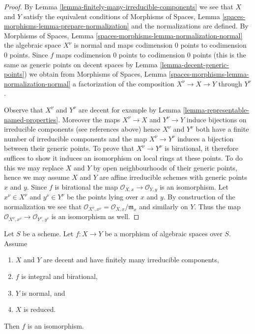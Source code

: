 \begin{proof}
By Lemma \ref{lemma-finitely-many-irreducible-components} we see that
$X$ and $Y$ satisfy the equivalent conditions of
Morphisms of Spaces, Lemma \ref{spaces-morphisms-lemma-prepare-normalization}
and the normalizations are defined. By
Morphisms of Spaces, Lemma \ref{spaces-morphisms-lemma-normalization-normal}
the algebraic space $X^\nu$ is normal and maps codimension $0$ points
to codimension $0$ points. Since $f$ maps codimension $0$ points to
codimension $0$ points (this is the same as generic points on decent
spaces by Lemma \ref{lemma-decent-generic-points})
we obtain from
Morphisms of Spaces, Lemma \ref{spaces-morphisms-lemma-normalization-normal}
a factorization of the composition $X^\nu \to X \to Y$ through $Y^\nu$.

\medskip\noindent
Observe that $X^\nu$ and $Y^\nu$ are decent for example by
Lemma \ref{lemma-representable-named-properties}.
Moreover the maps $X^\nu \to X$ and $Y^\nu \to Y$
induce bijections on irreducible components (see references above)
hence $X^\nu$ and $Y^\nu$ both have a finite number of irreducible
components and the map $X^\nu \to Y^\nu$ induces a bijection
between their generic points.
To prove that $X^\nu \to Y^\nu$ is birational, it therefore
suffices to show it induces an isomorphism on local rings at
these points. To do this we may replace $X$ and $Y$ by open neighbourhoods
of their generic points, hence we may assume $X$ and $Y$ are affine
irreducible schemes with generic points $x$ and $y$. Since
$f$ is birational the map $\mathcal{O}_{X, x} \to \mathcal{O}_{Y, y}$
is an isomorphism. Let $x^\nu \in X^\nu$ and $y^\nu \in Y^\nu$ be
the points lying over $x$ and $y$.
By construction of the normalization
we see that $\mathcal{O}_{X^\nu, x^\nu} = \mathcal{O}_{X, x}/\mathfrak m_x$
and similarly on $Y$. Thus the map
$\mathcal{O}_{X^\nu, x^\nu} \to \mathcal{O}_{Y^\nu, y^\nu}$
is an isomorphism as well.
\end{proof}

\begin{lemma}
\label{lemma-finite-birational-over-normal}
Let $S$ be a scheme. Let $f : X \to Y$ be a morphism of algebraic
spaces over $S$. Assume
\begin{enumerate}
\item $X$ and $Y$ are decent and have finitely many irreducible components,
\item $f$ is integral and birational,
\item $Y$ is normal, and
\item $X$ is reduced.
\end{enumerate}
Then $f$ is an isomorphism.
\end{lemma}


